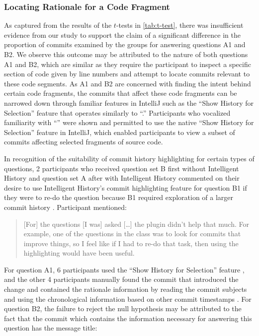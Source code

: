 \subsubsection{Locating Rationale for a Code Fragment}

As captured from the results of the $t$-tests in \autoref{tab:t-test}, 
there was insufficient evidence from our study to support the claim of a significant difference in 
the proportion of commits examined by the groups for answering questions A1 and B2.
We observe this outcome may be attributed to the nature of both questions A1 and B2, 
which are similar as they require the participant to  inspect a specific section of code 
given by line numbers and attempt to locate commits relevant to these code segments.
As A1 and B2 are concerned with finding the intent behind certain code fragments, 
the commits that affect these code fragments can be narrowed down
through familiar features in IntelliJ such as the ``Show History for Selection'' feature 
that operates similarly to ``.''
Participants who vocalized familiarity with  ``'' were shown and permitted to use the native 
``Show History for Selection'' feature in IntelliJ, 
which enabled participants to view a subset of commits affecting selected fragments of source code.

In recognition of the suitability of commit history highlighting for certain types of questions,
2 participants who received question set B first without Intelligent History and question set A 
after with Intelligent History commented on their desire to use Intelligent History's commit highlighting feature for question B1
if they were to re-do the question because B1 required exploration of a larger commit history .
Participant  mentioned:

\begin{quote}
  [For] the questions [I was] asked [\dots] the plugin didn’t help that much. 
  For example, one of the questions in the  class was to look for commits that improve things, 
  so I feel like if I had to re-do that task, then using the highlighting would have been useful.
\end{quote}

For question A1, 6 participants used the ``Show History for Selection'' feature ,
and the other 4 participants manually found the commit that introduced the change 
and contained the rationale information by reading the commit  subjects and using the chronological information based on other commit timestamps .
For question B2, the failure to reject the null hypothesis may be attributed to the fact that the commit  which contains the information necessary for answering this question has the message title: 

